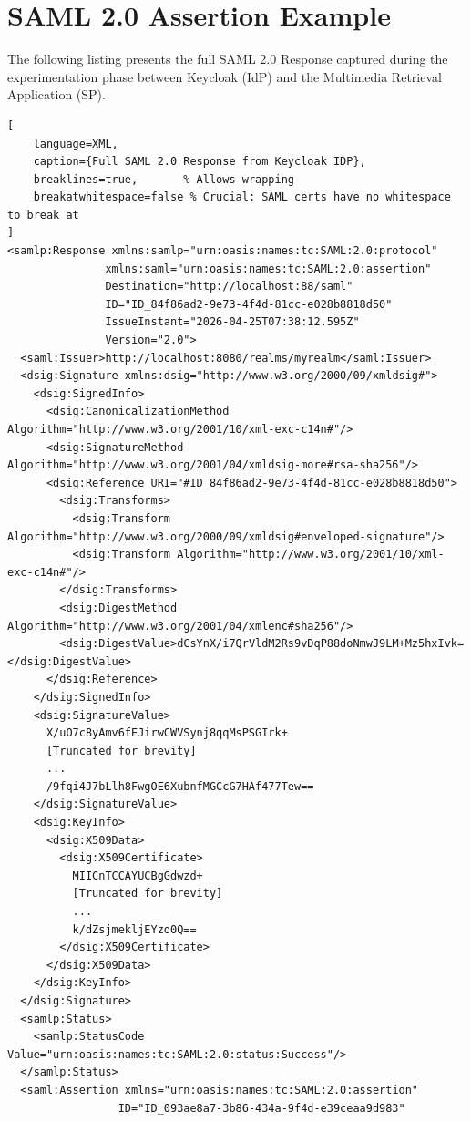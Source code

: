 \section{SAML 2.0 Assertion Example}
\label{annex:saml_assertion}

The following listing presents the full SAML 2.0 Response captured during the experimentation phase between Keycloak (IdP) and the Multimedia Retrieval Application (SP).

\begin{lstlisting}[
    language=XML, 
    caption={Full SAML 2.0 Response from Keycloak IDP}, 
    breaklines=true,       % Allows wrapping
    breakatwhitespace=false % Crucial: SAML certs have no whitespace to break at
]
<samlp:Response xmlns:samlp="urn:oasis:names:tc:SAML:2.0:protocol" 
               xmlns:saml="urn:oasis:names:tc:SAML:2.0:assertion" 
               Destination="http://localhost:88/saml" 
               ID="ID_84f86ad2-9e73-4f4d-81cc-e028b8818d50" 
               IssueInstant="2026-04-25T07:38:12.595Z" 
               Version="2.0">
  <saml:Issuer>http://localhost:8080/realms/myrealm</saml:Issuer>
  <dsig:Signature xmlns:dsig="http://www.w3.org/2000/09/xmldsig#">
    <dsig:SignedInfo>
      <dsig:CanonicalizationMethod Algorithm="http://www.w3.org/2001/10/xml-exc-c14n#"/>
      <dsig:SignatureMethod Algorithm="http://www.w3.org/2001/04/xmldsig-more#rsa-sha256"/>
      <dsig:Reference URI="#ID_84f86ad2-9e73-4f4d-81cc-e028b8818d50">
        <dsig:Transforms>
          <dsig:Transform Algorithm="http://www.w3.org/2000/09/xmldsig#enveloped-signature"/>
          <dsig:Transform Algorithm="http://www.w3.org/2001/10/xml-exc-c14n#"/>
        </dsig:Transforms>
        <dsig:DigestMethod Algorithm="http://www.w3.org/2001/04/xmlenc#sha256"/>
        <dsig:DigestValue>dCsYnX/i7QrVldM2Rs9vDqP88doNmwJ9LM+Mz5hxIvk=</dsig:DigestValue>
      </dsig:Reference>
    </dsig:SignedInfo>
    <dsig:SignatureValue>
      X/uO7c8yAmv6fEJirwCWVSynj8qqMsPSGIrk+
      [Truncated for brevity]
      ...
      /9fqi4J7bLlh8FwgOE6XubnfMGCcG7HAf477Tew==
    </dsig:SignatureValue>
    <dsig:KeyInfo>
      <dsig:X509Data>
        <dsig:X509Certificate>
          MIICnTCCAYUCBgGdwzd+
          [Truncated for brevity]
          ...
          k/dZsjmekljEYzo0Q==
        </dsig:X509Certificate>
      </dsig:X509Data>
    </dsig:KeyInfo>
  </dsig:Signature>
  <samlp:Status>
    <samlp:StatusCode Value="urn:oasis:names:tc:SAML:2.0:status:Success"/>
  </samlp:Status>
  <saml:Assertion xmlns="urn:oasis:names:tc:SAML:2.0:assertion" 
                 ID="ID_093ae8a7-3b86-434a-9f4d-e39ceaa9d983" 

\end{lstlisting}
